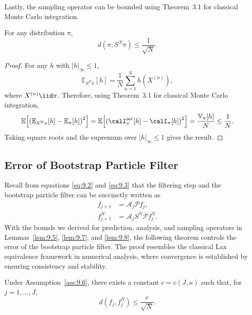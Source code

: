 Lastly, the sampling operator can be bounded using Theorem~3.1 for classical Monte Carlo
integration.

\begin{lemma}
  \label{lem:9.8}
  For any distribution $\pi$,
  \[
    d(\pi, S^N \pi) \leq \frac{1}{\sqrt{N}}.
  \]
\end{lemma}

\begin{proof}
  For any $h$ with $|h|_\infty \leq 1$,
  \[
    \mathbb{E}_{S^N\pi}[h] = \frac{1}{N}\sum_{n=1}^{N} h\!\left(X^{(n)}\right),
  \]
  where $X^{(n)} \iid \pi$. Therefore, using Theorem~3.1 for classical Monte Carlo
  integration,
  \[
    \mathbb{E}\!\left[\left(\mathbb{E}_{S^N\pi}[h] - \mathbb{E}_\pi[h]\right)^2\right]
    = \mathbb{E}\!\left[\left(\calI_\pi^{\mathrm{mc}}[h] - \calI_\pi[h]\right)^2\right]
    = \frac{\mathbb{V}_\pi[h]}{N}
    \leq \frac{1}{N}.
  \]
  Taking square roots and the supremum over $|h|_\infty \leq 1$ gives the result.
\end{proof}

\subsection{Error of Bootstrap Particle Filter}
\label{sec:9.2.3}

Recall from equations \eqref{eq:9.2} and \eqref{eq:9.3} that the filtering step and the
bootstrap particle filter can be succinctly written as
\begin{align}
  f_{j+1} &= \mathcal{A}_j \mathcal{P} f_j, \label{eq:9.5} \\
  f_{j+1}^N &= \mathcal{A}_j S^N \mathcal{P} f_j^N. \label{eq:9.6}
\end{align}
With the bounds we derived for prediction, analysis, and sampling operators in
Lemmas~\ref{lem:9.5}, \ref{lem:9.7}, and \ref{lem:9.8}, the following theorem controls
the error of the bootstrap particle filter. The proof resembles the classical Lax
equivalence framework in numerical analysis, where convergence is established by ensuring
consistency and stability.

\begin{theorem}
  \label{thm:9.9}
  Under Assumption~\ref{ass:9.6}, there exists a constant $c = c(J, \kappa)$ such that,
  for $j = 1, \ldots, J$,
  \[
    d(f_j, f_j^N) \leq \frac{c}{\sqrt{N}}.
  \]
\end{theorem}

